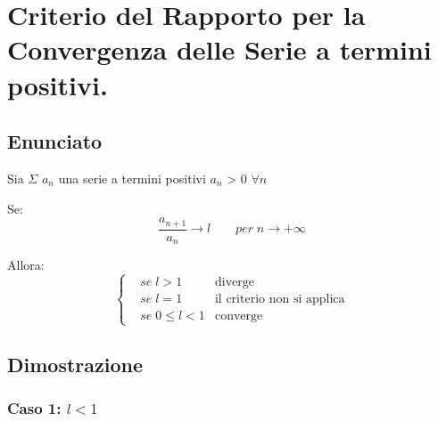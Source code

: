 \documentclass[../dimostrazioni]{subfiles}
\begin{document}
    \chapter{Criterio del Rapporto per la Convergenza delle Serie a termini positivi.}
    \label{criterioRapportoSerie}

        \section*{Enunciato}

            Sia \(\Sigma\) \(a_n\) una serie a termini positivi \(a_n\) > 0 \(\forall n\)
            
            Se:
             \[\frac{a_{n+1}}{a_n} \longrightarrow l \qquad  per \; n  \rightarrow +\infty \]
                
            
            
            Allora:
            \[
                \left\{
                    \begin{aligned}
                        &se \; l > 1 & \text{diverge} \\
                        &se \; l = 1 & \text{il criterio non si applica} \\
                        &se \; 0 \leqslant l < 1 & \text{converge}
                    \end{aligned}
                \right.
            \]
            
        \section*{Dimostrazione}
            
            \subsection*{Caso 1:  \(l < 1\)} 
            
\end{document}
